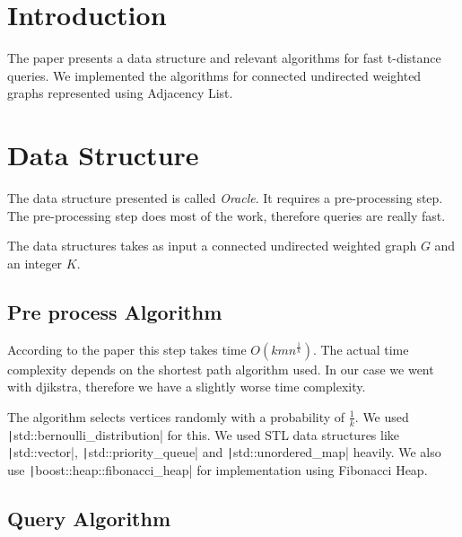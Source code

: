 \documentclass[12pt, a4paper]{article}
\newcommand{\code}[1]{\texttt|#1|}
\begin{document}
    \begin{minipage}[]{\textwidth}
    \end{minipage}

    \section{Introduction}
    
    The paper\cite{paper} presents a data structure and relevant algorithms for fast t-distance queries. We implemented the algorithms for connected undirected weighted graphs represented using Adjacency List.

    \section{Data Structure}

    The data structure presented is called \emph{Oracle}. It requires a pre-processing step. The pre-processing step does most of the work, therefore queries are really fast.

    The data structures takes as input a connected undirected weighted graph $G$ and an integer $K$.

    \subsection{Pre process Algorithm}

    According to the paper this step takes time $O(kmn^{\frac{1}{k}})$. The actual time complexity depends on the shortest path algorithm used. In our case we went with djikstra, therefore we have a slightly worse time complexity.

    The algorithm selects vertices randomly with a probability of $\frac{1}{k}$. We used \code{std::bernoulli_distribution} for this. We used STL data structures like \code{std::vector}, \code{std::priority_queue} and \code{std::unordered_map} heavily. We also use \code{boost::heap::fibonacci_heap} for implementation using Fibonacci Heap.

    \subsection{Query Algorithm}
\end{document}

